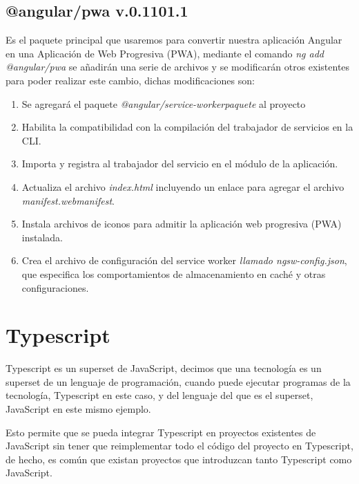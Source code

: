\documentclass[a4paper, 12pt]{book}
\begin{document}
\subsection{@angular/pwa v.0.1101.1}
\label{subsec:@angular/pwa}
Es el paquete principal que usaremos para convertir nuestra aplicación Angular en una Aplicación de Web Progresiva (PWA), mediante el comando \textit{ng add @angular/pwa} se añadirán una serie de archivos y se modificarán otros existentes para poder realizar este cambio, dichas modificaciones son:

\begin{enumerate}
\item Se agregará el paquete \textit{@angular/service-workerpaquete} al proyecto

\item Habilita la compatibilidad con la compilación del trabajador de servicios en la CLI.

\item Importa y registra al trabajador del servicio en el módulo de la aplicación.

\item Actualiza el archivo \textit{index.html} incluyendo un enlace para agregar el archivo \textit{manifest.webmanifest}.

\item Instala archivos de iconos para admitir la aplicación web progresiva (PWA) instalada.

\item Crea el archivo de configuración del service worker \textit{llamado ngsw-config.json}, que especifica los comportamientos de almacenamiento en caché y otras configuraciones.
\end{enumerate}


\section{Typescript}
\label{sec:Typescript}
Typescript es un superset de JavaScript, decimos que una tecnología es un superset de un lenguaje de programación, cuando puede ejecutar programas de la tecnología, Typescript en este caso, y del lenguaje del que es el superset, JavaScript en este mismo ejemplo.

	Esto permite que se pueda integrar Typescript en proyectos existentes de JavaScript sin tener que reimplementar todo el código del proyecto en Typescript, de hecho, es común que existan proyectos que introduzcan tanto Typescript como JavaScript.
	
\end{document}
